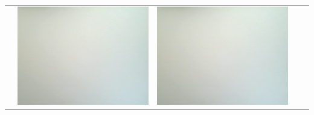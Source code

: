 \begin{tabular}{c c c c c}
 & 
\includegraphics[scale=0.11]{media/weissbilder/weissbild_3.png}
 &
\includegraphics[scale=0.11]{media/weissbilder/weissbild_4.png}
 \\ 


\end{tabular}
